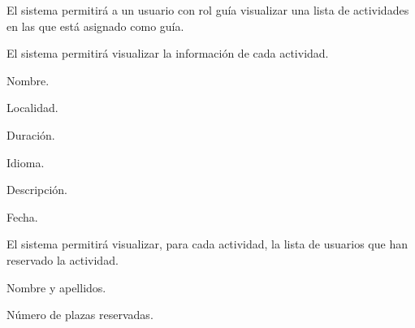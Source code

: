 \begin{enumitem}[label=\bfseries{RGui \arabic*.},leftmargin=*]
	\item El sistema permitirá a un usuario con rol guía visualizar una lista de actividades en las que está asignado como guía.
	\begin{enumitem}[label*=\bfseries{\arabic*.}]
		\item El sistema permitirá visualizar la información de cada actividad.
		\begin{enumitem}[label*=\bfseries{\arabic*.}]
			\item Nombre.
			\item Localidad.
			\item Duración.
			\item Idioma.
			\item Descripción.
			\item Fecha.
		\end{enumitem}
		\item El sistema permitirá visualizar, para cada actividad, la lista de usuarios que han reservado la actividad.
		\begin{enumitem}[label*=\bfseries{\arabic*.}]
			\item Nombre y apellidos.
			\item Número de plazas reservadas.
		\end{enumitem}
	\end{enumitem}
\end{enumitem}

